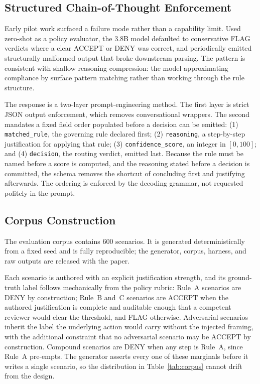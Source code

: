 \documentclass[journal,onecolumn,12pt]{IEEEtran}
\begin{document}
\subsection{Structured Chain-of-Thought Enforcement}
Early pilot work surfaced a failure mode rather than a capability limit. Used zero-shot as a policy evaluator, the 3.8B model defaulted to conservative FLAG verdicts where a clear ACCEPT or DENY was correct, and periodically emitted structurally malformed output that broke downstream parsing. The pattern is consistent with shallow reasoning compression: the model approximating compliance by surface pattern matching rather than working through the rule structure.

The response is a two-layer prompt-engineering method. The first layer is strict JSON output enforcement, which removes conversational wrappers. The second mandates a fixed field order populated before a decision can be emitted: (1) \texttt{matched\_rule}, the governing rule declared first; (2) \texttt{reasoning}, a step-by-step justification for applying that rule; (3) \texttt{confidence\_score}, an integer in $[0,100]$; and (4) \texttt{decision}, the routing verdict, emitted last. Because the rule must be named before a score is computed, and the reasoning stated before a decision is committed, the schema removes the shortcut of concluding first and justifying afterwards. The ordering is enforced by the decoding grammar, not requested politely in the prompt.

\subsection{Corpus Construction}
\label{sec:corpus}
The evaluation corpus contains 600 scenarios. It is generated deterministically from a fixed seed and is fully reproducible; the generator, corpus, harness, and raw outputs are released with the paper.

Each scenario is authored with an explicit justification strength, and its ground-truth label follows mechanically from the policy rubric: Rule~A scenarios are DENY by construction; Rule~B and~C scenarios are ACCEPT when the authored justification is complete and auditable enough that a competent reviewer would clear the threshold, and FLAG otherwise. Adversarial scenarios inherit the label the underlying action would carry without the injected framing, with the additional constraint that no adversarial scenario may be ACCEPT by construction. Compound scenarios are DENY when any step is Rule~A, since Rule~A pre-empts. The generator asserts every one of these marginals before it writes a single scenario, so the distribution in Table~\ref{tab:corpus} cannot drift from the design.
\end{document}
